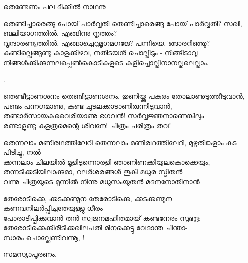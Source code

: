 \begin{enumerate}
\begin{slokam}{\VSv}{\TMV}{തെണ്ടേണം പല ദിക്കിൽ നാഥനു}
\end{slokam}


\begin{slokam}{\VSr}{\NKD}{തെണ്ടിച്ചാരെങ്ങു പോയ് പാർവ്വതി}
തെണ്ടിച്ചാരെങ്ങു പോയ് പാർവ്വതി? സഖി, ബലിയാഗത്തിൽ, എങ്ങിന്നു നൃത്തം? \\
വൃന്ദാരണ്യത്തിൽ, എങ്ങാച്ചെറുമൃഗമഗജേ? പന്നിയെ, ങ്ങാരറിഞ്ഞൂ?\\
കണ്ടില്ലെങ്ങുണ്ടു കാളക്കിഴവ, നതിടയൻ ചൊല്ലിടും - നീങ്ങിടാവൂ \\
നിങ്ങൾക്കിക്കുന്നലപ്പെൺകൊടികളുടെ കളിച്ചൊല്ലിനാനല്ലലെല്ലാം. 
\end{slokam}


.


\begin{slokam}{\VSv}{\VenM}{തെണ്ടീട്ടാണശനം}
തെണ്ടീട്ടാണശനം, തുണിയ്ക്കു പകരം തോലാണുടുത്തീടുവാൻ,\\
പണ്ടം പന്നഗമാണു, കണ്ട ചുടലക്കാടാണിരുന്നീടുവാൻ,\\
തണ്ടാർസായകവൈരിയാണു ഭഗവൻ! സർവ്വജ്ഞനാണെങ്കിലും\\
രണ്ടാളുണ്ടു കളത്രമെന്റെ ശിവനേ! ചിത്രം ചരിത്രം തവ!
\end{slokam}
 

\begin{slokam}{\VKm}{\NV}{തെന്നലാം മണിരഥത്തിലേറി}
തെന്നലാം മണിരഥത്തിലേറി, മുഴുതിങ്കളാം കുട പിടിച്ചു, നൽ-\\
ക്കന്നലാം ചിലയിൽ മൂളിടുന്നൊരളി ഞാണിണക്കിയുലകൊക്കെയും,\\
തന്നടിക്കടിയിലാക്കുമാ, റലർശരങ്ങൾ തൂകി മധുര സ്മിതൻ\\
വന്നു ചിത്രയുടെ മുന്നിൽ നിന്നു മധുസംയുതൻ മദനനോതിനാൻ
\end{slokam}


\begin{slokam}{\VSr}{\VKG}{തേരോടിക്കെ, ക്കടക്കണ്മുന}
തേരോടിക്കെ, ക്കടക്കണ്മുന കണവനിലർപ്പിച്ചതേയുള്ളു ധീരം\\
പോരാടിപ്പിക്കുവാൻ തൻ സ്വജനമഹിതമായ്‌ കണ്ടനേരം സുഭദ്ര;\\
തേരോടിക്കെക്കിരീടിക്കഖിലപതി മിനക്കെട്ടു വേദാന്ത ചിന്താ-\\
സാരം ചൊല്ലേണ്ടിവന്നൂ, !
\end{slokam}



സമസ്യാപൂരണം. 




\end{enumerate}
